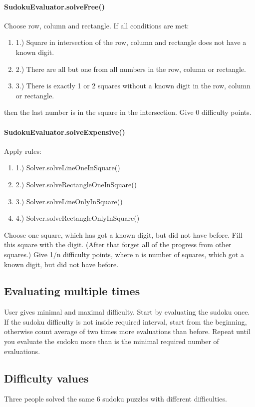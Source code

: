 \documentclass{report}
\begin{document}
\paragraph{SudokuEvaluator.solveFree()}
Choose row, column and rectangle. If all conditions are met:
\begin{enumerate}
    \item[] 1.) Square in intersection of the row, column and rectangle does not have a known digit.
    \item[] 2.) There are all but one from all numbers in the row, column or rectangle.
    \item[] 3.) There is exactly 1 or 2 squares without a known digit in the row, column or rectangle.
\end{enumerate}
then the last number is in the square in the intersection. \newline
Give 0 difficulty points.

\paragraph{SudokuEvaluator.solveExpensive()}
Apply rules:
\begin{enumerate}
    \item[] 1.) Solver.solveLineOneInSquare()
    \item[] 2.) Solver.solveRectangleOneInSquare()
    \item[] 3.) Solver.solveLineOnlyInSquare()
    \item[] 4.) Solver.solveRectangleOnlyInSquare()
\end{enumerate}
Choose one square, which has got a known digit, but did not have before. Fill this square with the digit. (After that forget all of the progress from other squares.)
Give 1/n difficulty points, where n is number of squares, which got a known digit, but did not have before.

\subsection{Evaluating multiple times}
User gives minimal and maximal difficulty. \newline
Start by evaluating the sudoku once. If the sudoku difficulty is not inside required interval, start from the beginning, otherwise count average of two times more evaluations than before. Repeat until you evaluate the sudoku more than is the minimal required number of evaluations.

\subsection{Difficulty values}
Three people solved the same 6 sudoku puzzles with different difficulties.
\end{document}
